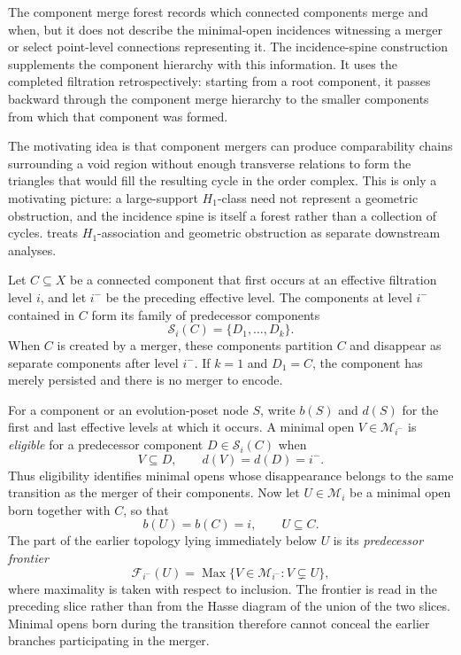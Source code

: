 \documentclass[a4paper,11pt]{article}
\theoremstyle{definition}
\theoremstyle{remark}
\begin{document}
The component merge forest records which connected components merge and when, but it does not describe the minimal-open incidences witnessing a merger or select point-level connections representing it. The incidence-spine construction supplements the component hierarchy with this information. It uses the completed filtration retrospectively: starting from a root component, it passes backward through the component merge hierarchy to the smaller components from which that component was formed.

The motivating idea is that component mergers can produce comparability chains surrounding a void region without enough transverse relations to form the triangles that would fill the resulting cycle in the order complex. This is only a motivating picture: a large-support $H_1$-class need not represent a geometric obstruction, and the incidence spine is itself a forest rather than a collection of cycles.  treats $H_1$-association and geometric obstruction as separate downstream analyses.

Let $C\subseteq X$ be a connected component that first occurs at an effective filtration level $i$, and let $i^-$ be the preceding effective level. The components at level $i^-$ contained in $C$ form its family of predecessor components
$$
\mathcal S_i(C)=\{D_1,\ldots,D_k\}.
$$
When $C$ is created by a merger, these components partition $C$ and disappear as separate components after level $i^-$. If $k=1$ and $D_1=C$, the component has merely persisted and there is no merger to encode.

For a component or an evolution-poset node $S$, write $b(S)$ and $d(S)$ for the first and last effective levels at which it occurs. A minimal open $V\in\mathcal M_{i^-}$ is \emph{eligible} for a predecessor component $D\in\mathcal S_i(C)$ when
$$
V\subseteq D,\qquad d(V)=d(D)=i^-.
$$
Thus eligibility identifies minimal opens whose disappearance belongs to the same transition as the merger of their components. Now let $U\in\mathcal M_i$ be a minimal open born together with $C$, so that
$$
b(U)=b(C)=i,\qquad U\subseteq C.
$$
The part of the earlier topology lying immediately below $U$ is its \emph{predecessor frontier}
$$
\mathcal F_{i^-}(U) = \operatorname{Max}\{V\in\mathcal M_{i^-}\colon V\subsetneq U\},
$$
where maximality is taken with respect to inclusion. The frontier is read in the preceding slice rather than from the Hasse diagram of the union of the two slices. Minimal opens born during the transition therefore cannot conceal the earlier branches participating in the merger.
\end{document}
